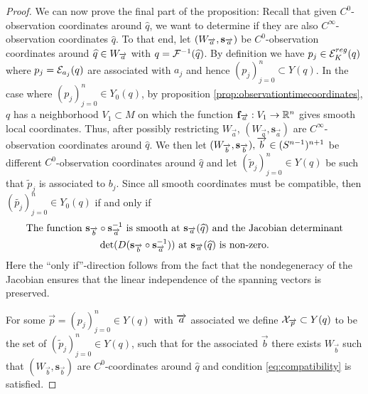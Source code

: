 \begin{proof}
    We can now prove the final part of the proposition: Recall that given $C^0$-observation coordinates around $\widehat{q}$, we want to determine if they are also $C^\infty$-observation coordinates $\widehat{q}$.
    To that end, let $(W_\aa,\mathbf{s}_\aa)$ be $C^0$-observation coordinates around $\widehat{q}\in W_\aa$ with $q=\F^{-1}(\widehat{q})$. By definition we have $p_j\in \er(q)$ where $p_j=\mc{E}_{a_j}(q)$ are associated with $a_j$ and hence $(p_j)_{j=0}^n\subset Y(q)$. In the case where $(p_j)^n_{j=0}\in Y_0(q)$, by proposition \ref{prop:observationtimecoordinates}, $q$ has a neighborhood $V_1\subset M$ on which the function $\mathbf{f}_{\overrightarrow{a}}:V_1\to\R^n$ gives smooth local coordinates. Thus, after possibly restricting $W_{\overrightarrow{a}}$, $(W_{\overrightarrow{a}},\mathbf{s}_{\overrightarrow{a}})$ are $C^\infty$-observation coordinates around $\widehat{q}$. 
    We then let $(W_{\overrightarrow{b}},\mathbf{s}_{\overrightarrow{b}}), \overrightarrow{b}\in (\sn)^{n+1}$ be different $C^0$-observation coordinates around $\widehat{q}$ and let $(\widetilde{p}_j)^n_{j=0}\in Y(q)$ be such that $\widetilde{p}_j$ is associated to $b_j$.
    Since all smooth coordinates must be compatible, then $(\widetilde{p_j})^n_{j=0}\in Y_0(q)$ if and only if 
    \begin{multline}\label{eq:compatibility}
        \text{The function $\mathbf{s}_{\overrightarrow{b}}\circ \mathbf{s}_{\aa}^{-1}$ is smooth at $\mathbf{s}_{\overrightarrow{a}}(\widehat{q})$ and the Jacobian determinant}\\
        \det(D(\mathbf{s}_{\overrightarrow{b}}\circ \mathbf{s}_{\overrightarrow{a}}^{-1}))\text{ at } \mathbf{s}_{\overrightarrow{a}}(\widehat{q})\text{ is non-zero.}
    \end{multline}
    Here the \enquote{only if}-direction follows from the fact that the nondegeneracy of the Jacobian ensures that the linear independence of the spanning vectors is preserved.
    
    For some $\overrightarrow{p}=(p_j)^n_{j=0}\in Y(q)$ with $\aa$ associated we define $\mc{X}_{\overrightarrow{p}}\subset Y(q)$ to be the set of $(\widetilde{p}_j)^n_{j=0}\in Y(q)$, such that for the associated $\overrightarrow{b}$ there exists $W_{\overrightarrow{b}}$ such that $(W_{\overrightarrow{b}},\mathbf{s}_{\overrightarrow{b}})$ are $C^0$-coordinates around $\widehat{q}$ and condition \ref{eq:compatibility} is satisfied.
    

\end{proof}
